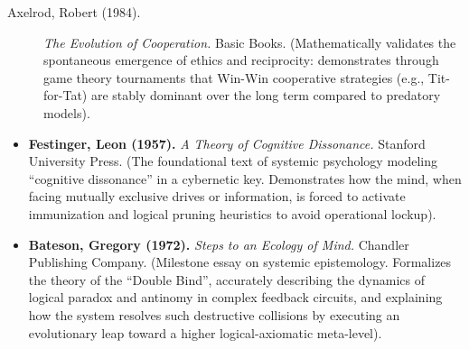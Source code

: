 \documentclass[11pt,a4paper,oneside]{article} %
\providecommand{\tightlist}{%
  \setlength{\itemsep}{0pt}\setlength{\parskip}{0pt}}
\begin{document}
\begin{description}
\item[Axelrod, Robert (1984).] \emph{The Evolution of Cooperation.} Basic Books. (Mathematically validates the spontaneous emergence of ethics and reciprocity: demonstrates through game theory tournaments that Win-Win cooperative strategies (e.g., Tit-for-Tat) are stably dominant over the long term compared to predatory models).
\end{description}

\hypertarget{a1.10-axiomatic-homeostasis-and-paradox-reduction}{%
\label{a1.10-axiomatic-homeostasis-and-paradox-reduction}}


\begin{itemize}
\tightlist
\item
  \textbf{Festinger, Leon (1957).} \emph{A Theory of Cognitive
  Dissonance.} Stanford University Press. (The foundational text of
  systemic psychology modeling ``cognitive dissonance'' in a cybernetic
  key. Demonstrates how the mind, when facing mutually exclusive drives
  or information, is forced to activate immunization and logical pruning
  heuristics to avoid operational lockup).
\item
  \textbf{Bateson, Gregory (1972).} \emph{Steps to an Ecology of Mind.}
  Chandler Publishing Company. (Milestone essay on systemic
  epistemology. Formalizes the theory of the ``Double Bind'', accurately
  describing the dynamics of logical paradox and antinomy in complex
  feedback circuits, and explaining how the system resolves such
  destructive collisions by executing an evolutionary leap toward a
  higher logical-axiomatic meta-level).
\end{itemize}

\hypertarget{a2.2-applicative-line-frontier-solutions-frontier-papers-2024-2026}{%
\label{a2.2-applicative-line-frontier-solutions-frontier-papers-2024-2026}}

\hypertarget{a1.1-active-inference-and-autonomous-agentic-ai}{%
\label{a1.1-active-inference-and-autonomous-agentic-ai}}
\end{document}
